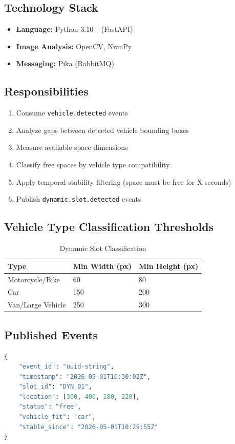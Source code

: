 \documentclass[12pt,a4paper]{report}
\begin{document}
\subsection{Technology Stack}
\begin{itemize}
    \item \textbf{Language:} Python 3.10+ (FastAPI)
    \item \textbf{Image Analysis:} OpenCV, NumPy
    \item \textbf{Messaging:} Pika (RabbitMQ)
\end{itemize}

\subsection{Responsibilities}
\begin{enumerate}
    \item Consume \texttt{vehicle.detected} events
    \item Analyze gaps between detected vehicle bounding boxes
    \item Measure available space dimensions
    \item Classify free spaces by vehicle type compatibility
    \item Apply temporal stability filtering (space must be free for X seconds)
    \item Publish \texttt{dynamic.slot.detected} events
\end{enumerate}

\subsection{Vehicle Type Classification Thresholds}
\begin{table}[H]
\centering
\caption{Dynamic Slot Classification}
\begin{tabular}{|l|l|l|}
\hline
\textbf{Type} & \textbf{Min Width (px)} & \textbf{Min Height (px)} \\
\hline
Motorcycle/Bike & 60 & 80 \\
\hline
Car & 150 & 200 \\
\hline
Van/Large Vehicle & 250 & 300 \\
\hline
\end{tabular}
\end{table}

\subsection{Published Events}
\begin{lstlisting}[language=Python, caption=dynamic.slot.detected.v1 Event Schema]
{
    "event_id": "uuid-string",
    "timestamp": "2026-05-01T10:30:02Z",
    "slot_id": "DYN_01",
    "location": [300, 400, 180, 220],
    "status": "free",
    "vehicle_fit": "car",
    "stable_since": "2026-05-01T10:29:55Z"
}
\end{lstlisting}
\end{document}
